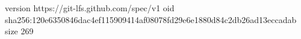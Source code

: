 version https://git-lfs.github.com/spec/v1
oid sha256:120e6350846dac4ef115909414af08078fd29e6e1880d84c2db26ad13eccadab
size 269
